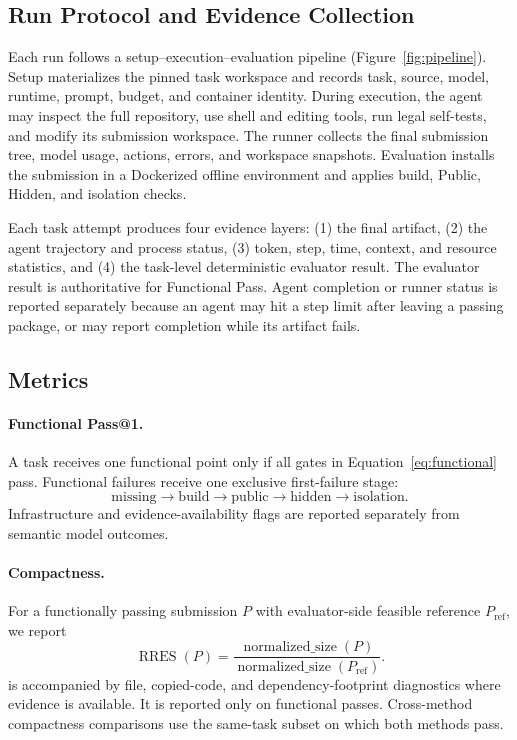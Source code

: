 \subsection{Run Protocol and Evidence Collection}

Each run follows a setup--execution--evaluation pipeline
(Figure~\ref{fig:pipeline}). Setup materializes the pinned task workspace and
records task, source, model, runtime, prompt, budget, and container identity.
During execution, the agent may inspect the full repository, use shell and
editing tools, run legal self-tests, and modify its submission workspace. The
runner collects the final submission tree, model usage, actions, errors, and
workspace snapshots. Evaluation installs the submission in a Dockerized
offline environment and applies build, Public, Hidden, and isolation checks.

Each task attempt produces four evidence layers: (1) the final artifact,
(2) the agent trajectory and process status, (3) token, step, time, context,
and resource statistics, and (4) the task-level deterministic evaluator result.
The evaluator result is authoritative for Functional Pass. Agent completion or
runner status is reported separately because an agent may hit a step limit after
leaving a passing package, or may report completion while its artifact fails.

\subsection{Metrics}

\paragraph{Functional Pass@1.}
A task receives one functional point only if all gates in
Equation~\ref{eq:functional} pass. Functional failures receive one exclusive
first-failure stage:
\begin{equation}
  \text{missing} \rightarrow \text{build} \rightarrow \text{public}
  \rightarrow \text{hidden} \rightarrow \text{isolation}.
\end{equation}
Infrastructure and evidence-availability flags are reported separately from
semantic model outcomes.

\paragraph{Compactness.}
For a functionally passing submission $P$ with evaluator-side feasible
reference $P_{\mathrm{ref}}$, we report
\begin{equation}
  \operatorname{RRES}(P)
  = \frac{\operatorname{normalized\_size}(P)}
         {\operatorname{normalized\_size}(P_{\mathrm{ref}})}.
  \label{eq:rres}
\end{equation}
\rres is accompanied by file, copied-code, and dependency-footprint
diagnostics where evidence is available. It is reported only on functional
passes. Cross-method compactness comparisons use the same-task subset on which
both methods pass.

